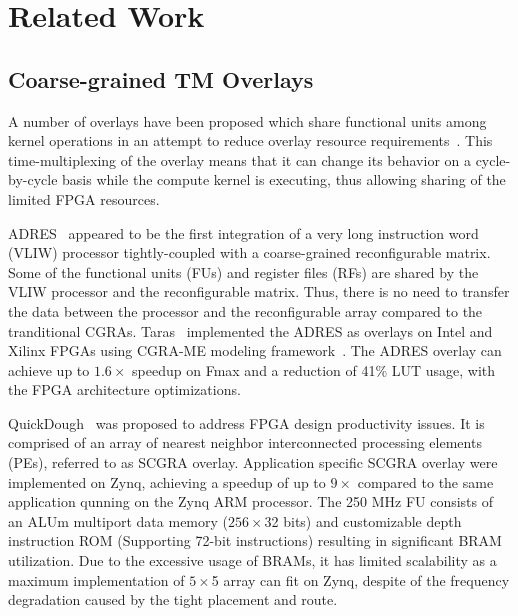 \section{Related Work}


\subsection{Coarse-grained TM Overlays}
A number of overlays have been proposed which share functional units among kernel operations in an attempt to reduce overlay resource requirements~\cite{severance2013embedded, liu2015quickdough, taras2019impact}.
This time-multiplexing of the overlay means that it can change its behavior on a cycle-by-cycle basis while the compute kernel is executing, thus allowing sharing of the limited FPGA resources.


ADRES~\cite{mei2003adres} appeared to be the first integration of a very long instruction word (VLIW) processor tightly-coupled with a coarse-grained reconfigurable matrix. 
Some of the functional units (FUs) and register files (RFs) are shared by the VLIW processor and the reconfigurable matrix. 
Thus, there is no need to transfer the data between the processor and the reconfigurable array compared to the tranditional CGRAs. 
Taras~\cite{taras2019impact} implemented the ADRES as overlays on Intel and Xilinx FPGAs using CGRA-ME modeling framework~\cite{chin2017cgra}. 
The ADRES overlay can achieve up to $1.6\times$ speedup on Fmax and a reduction of 41\% LUT usage, with the FPGA architecture optimizations. 


QuickDough~\cite{liu2015quickdough} was proposed to address FPGA design productivity issues. 
It is comprised of an array of nearest neighbor interconnected processing elements (PEs), referred to as SCGRA overlay.  
Application specific SCGRA overlay were implemented on Zynq, achieving a speedup of up to $9\times$ compared to the same application qunning on the Zynq ARM processor. 
The 250 MHz FU consists of an ALUm multiport data memory ($256\times$32 bits) and customizable depth instruction ROM (Supporting 72-bit instructions) resulting in significant BRAM utilization. 
Due to the excessive usage of BRAMs, it has limited scalability as a maximum implementation of $5\times$5 array can fit on Zynq, despite of the frequency degradation caused by the tight placement and route. 


